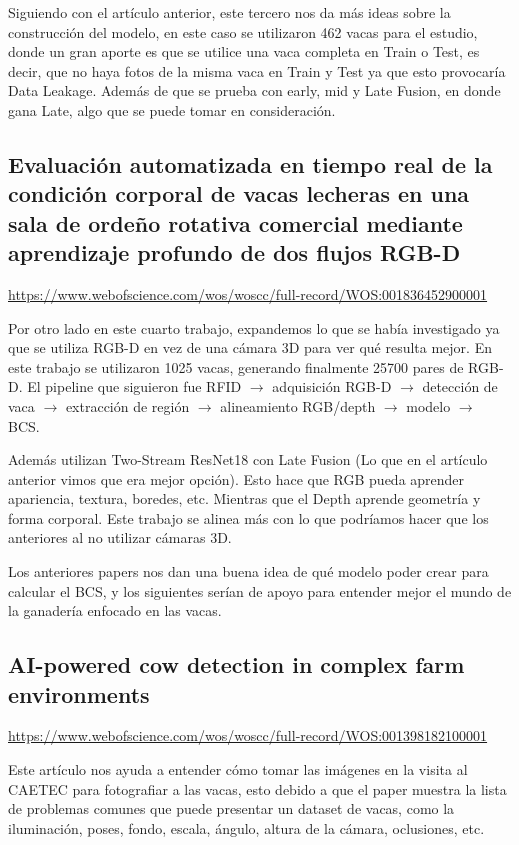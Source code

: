 \documentclass[11pt,letterpaper,DIV=12]{scrartcl}
\begin{document}
Siguiendo con el artículo anterior, este tercero nos da más ideas sobre la construcción del modelo, en este caso se utilizaron 462 vacas para el estudio, donde un gran aporte es que se utilice una vaca completa en Train o Test, es decir, que no haya fotos de la misma vaca en Train y Test ya que esto provocaría Data Leakage. Además de que se prueba con early, mid y Late Fusion, en donde gana Late, algo que se puede tomar en consideración.

\subsection{Evaluación automatizada en tiempo real de la condición corporal de vacas lecheras en una sala de ordeño rotativa comercial mediante aprendizaje profundo de dos flujos RGB-D}

\url{https://www.webofscience.com/wos/woscc/full-record/WOS:001836452900001}

Por otro lado en este cuarto trabajo, expandemos lo que se había investigado ya que se utiliza RGB-D en vez de una cámara 3D para ver qué resulta mejor. En este trabajo se utilizaron 1025 vacas, generando finalmente 25700 pares de RGB-D. El pipeline que siguieron fue RFID $\rightarrow$ adquisición RGB-D $\rightarrow$ detección de vaca $\rightarrow$ extracción de región $\rightarrow$ alineamiento RGB/depth $\rightarrow$ modelo $\rightarrow$ BCS.

Además utilizan Two-Stream ResNet18 con Late Fusion (Lo que en el artículo anterior vimos que era mejor opción). Esto hace que RGB pueda aprender apariencia, textura, boredes, etc. Mientras que el Depth aprende geometría y forma corporal. Este trabajo se alinea más con lo que podríamos hacer que los anteriores al no utilizar cámaras 3D.

Los anteriores papers nos dan una buena idea de qué modelo poder crear para calcular el BCS, y los siguientes serían de apoyo para entender mejor el mundo de la ganadería enfocado en las vacas.

\subsection{AI-powered cow detection in complex farm environments}

\url{https://www.webofscience.com/wos/woscc/full-record/WOS:001398182100001}

Este artículo nos ayuda a entender cómo tomar las imágenes en la visita al CAETEC para fotografiar a las vacas, esto debido a que el paper muestra la lista de problemas comunes que puede presentar un dataset de vacas, como la iluminación, poses, fondo, escala, ángulo, altura de la cámara, oclusiones, etc.
\end{document}
